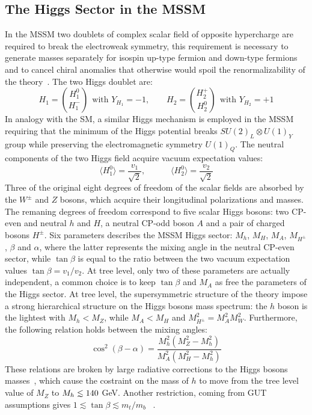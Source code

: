\subsection{The Higgs Sector in the MSSM }\label{sec:hsector}
In the MSSM two doublets of complex scalar field of opposite hypercharge are required to break the electroweak symmetry, 
this requirement is necessary to generate masses separately for isospin up-type fermion and down-type fermions~\cite{Susy2,Higgsm1,Higgsm2}
and to cancel chiral anomalies that otherwise would spoil the renormalizability of the theory~\cite{Higgsm3}. The two Higgs doublet  are:
\begin{equation}
H_1 = \binom{H_1^0}{H_1^-} ~ ~ \text{with } Y_{H_1} = -1, \quad \quad H_2 = \binom{H_2^+}{H_2^0} ~ ~ \text{with } Y_{H_2} = +1  
\end{equation}
In analogy with the SM, a similar Higgs mechanism is employed in the MSSM~\cite{MSSM1,Higgsm4}  requiring that the minimum 
of the Higgs potential breaks $SU(2)_L \otimes U(1)_Y$ group while preserving the electromagnetic symmetry $U(1)_Q$.
The neutral components of the 
two Higgs field acquire vacuum expectation values:
\begin{equation}
\langle H_1^0 \rangle = \frac{v_1}{\sqrt{2}}, \quad \quad \quad  \langle H_2^0 \rangle = \frac{v_2}{\sqrt{2}}
\end{equation}
Three of the original eight degrees of freedom of the scalar fields are absorbed by the $W^{\pm}$ and $Z$ bosons, which acquire
their longitudinal polarizations and masses. The remaning degrees of freedom correspond to five scalar Higgs bosons: two CP-even and neutral $h$ and $H$, 
a neutral CP-odd boson $A$ and a pair of charged bosons $H^{\pm}$. Six parameters describes the MSSM Higgs sector: $M_h$, $M_H$, $M_A$, $M_{H^\pm}$,
$\beta$ and $\alpha$, where the latter represents the mixing angle in the neutral CP-even sector, while $\tan \beta $ is equal to the 
ratio between the two vacuum expectation values $\tan \beta = v_1/v_2$.
At tree level,  only two of these parameters  are actually independent, a common choice is to keep $\tan \beta$ and $M_A$ as free the parameters of the Higgs sector. 
At tree level, the supersymmetric structure of the theory impose a strong hierarchical structure on the Higgs bosons mass spectrum: 
the $h$ boson is the lightest with  $M_h < M_Z$, while $M_A < M_H$ and $M_{H^\pm}^2 = M_A^2 M_W^2$. Furthermore, the 
following relation holds between the mixing angles:
\begin{equation}\label{eq:mixing}
\cos^2(\beta - \alpha) = \frac{M_h^2 (M_Z^2 - M_h^2)}{M_A^2 (M_H^2 - M_h^2)}
\end{equation}
These relations are broken by large radiative corrections to the Higgs bosons 
masses~\cite{Higgsm5}, which cause the costraint on the mass of $h$ to move from the tree level value of $M_Z$ to $\mh \apprle 140$ GeV.
Another restriction, coming from GUT assumptions gives $1 \apprle \tan \beta \apprle m_t/m_b$ ~\cite{Higgsm6}.


